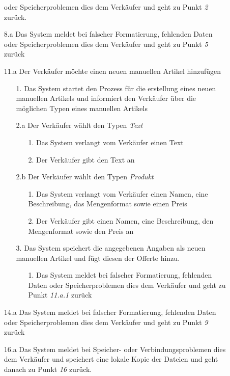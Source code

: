 \documentclass[journal]{combine}
\begin{document}
\begin{description}
\begin{enumerate}
			oder Speicherproblemen dies dem Verkäufer und geht zu Punkt \emph{2} zurück.
			\item [8.a] Das System meldet bei falscher Formatierung, fehlenden Daten
			oder Speicherproblemen dies dem Verkäufer und geht zu Punkt \emph{5} zurück
			\item [11.a] Der Verkäufer möchte einen neuen manuellen Artikel hinzufügen
			\begin{enumerate}
				\item[1.] Das System startet den Prozess für die erstellung eines neuen manuellen Artikels
				und informiert den Verkäufer über die möglichen Typen eines manuellen Artikels
				\item[2.a] Der Verkäufer wählt den Typen \emph{Text}
				\begin{enumerate}
					\item[1.] Das System verlangt vom Verkäufer einen Text
					\item[2.] Der Verkäufer gibt den Text an
				\end{enumerate}
				\item[2.b] Der Verkäufer wählt den Typen \emph{Produkt}
				\begin{enumerate}
					\item[1.] Das System verlangt vom Verkäufer einen Namen, eine Beschreibung,
					das Mengenformat sowie einen Preis
					\item[2.] Der Verkäufer gibt einen Namen, eine Beschreibung, den Mengenformat
					sowie den Preis an
				\end{enumerate} 
				\item[3.] Das System speichert die angegebenen Angaben als neuen manuellen Artikel
				und fügt diesen der Offerte hinzu.
				\begin{enumerate}
					\item [1.] Das System meldet bei falscher Formatierung, fehlenden Daten
					oder Speicherproblemen dies dem Verkäufer und geht zu Punkt \emph{11.a.1} zurück
				\end{enumerate} 
			\end{enumerate}
			\item [14.a] Das System meldet bei falscher Formatierung, fehlenden Daten
			oder Speicherproblemen dies dem Verkäufer und geht zu Punkt \emph{9} zurück
			\item [16.a] Das System meldet bei Speicher-  oder Verbindungsproblemen
			dies dem Verkäufer und speichert eine lokale Kopie der Dateien und geht danach
			zu Punkt \emph{16} zurück.
		\end{enumerate}
	\end{description}
	
\end{document}
